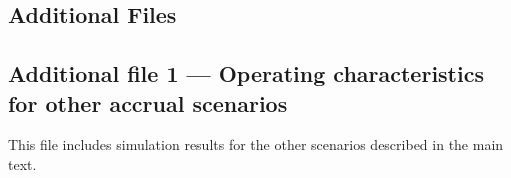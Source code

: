 \documentclass{bmcart}
\begin{document}
\begin{backmatter}










\section*{Additional Files}

\subsection*{Additional file 1 --- Operating characteristics for other accrual scenarios}

This file includes simulation results for the other scenarios described in the main text.

\end{backmatter}
\end{document}
